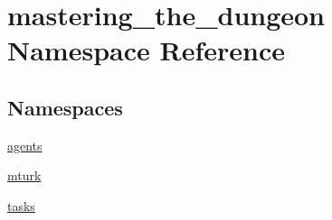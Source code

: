 \hypertarget{namespacemastering__the__dungeon}{}\section{mastering\+\_\+the\+\_\+dungeon Namespace Reference}
\label{namespacemastering__the__dungeon}
\subsection*{Namespaces}
\begin{DoxyCompactItemize}
\item 
 \hyperlink{namespacemastering__the__dungeon_1_1agents}{agents}
\item 
 \hyperlink{namespacemastering__the__dungeon_1_1mturk}{mturk}
\item 
 \hyperlink{namespacemastering__the__dungeon_1_1tasks}{tasks}
\end{DoxyCompactItemize}
